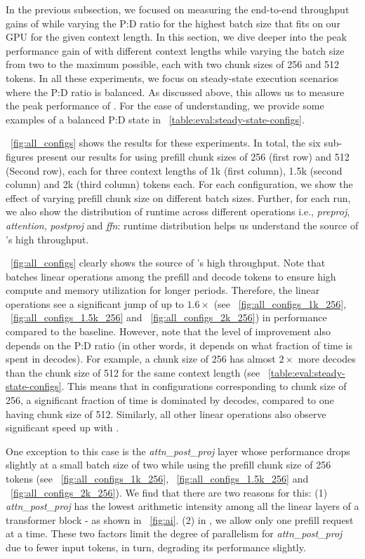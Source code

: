 


\if
In the previous subsection, we focused on measuring the end-to-end throughput gains of \sysname while varying the P:D ratio for the highest batch size that fits on our GPU for the given context length. In this section, we dive deeper into the peak performance gain of \sysname with different context lengths while varying the batch size from two to the maximum possible, each with two chunk sizes of 256 and 512 tokens. In all these experiments, we focus on steady-state execution scenarios where the P:D ratio is balanced. As discussed above, this allows us to measure the peak performance of \sysname. For the ease of understanding, we provide some examples of a balanced P:D state in ~\autoref{table:eval:steady-state-configs}.

~\autoref{fig:all_configs} shows the results for these experiments. In total, the six sub-figures present our results for using prefill chunk sizes of 256 (first row) and 512 (Second row), each for three context lengths of 1k (first column), 1.5k (second column) and 2k (third column) tokens each. For each configuration, we show the effect of varying prefill chunk size on different batch sizes. Further, for each run, we also show the distribution of runtime across different operations i.e., {\em preproj}, {\em attention}, {\em postproj} and {\em ffn}: runtime distribution helps us understand the source of \sysname's high throughput.

~\autoref{fig:all_configs} clearly shows the source of \sysname's high throughput. Note that \sysname batches linear operations among the prefill and decode tokens to ensure high compute and memory utilization for longer periods. Therefore, the linear operations see a significant jump of up to $1.6\times$ (see ~\autoref{fig:all_configs_1k_256}, ~\autoref{fig:all_configs_1.5k_256} and ~\autoref{fig:all_configs_2k_256}) in performance compared to the baseline. However, note that the level of improvement also depends on the P:D ratio (in other words, it depends on what fraction of time is spent in decodes). For example, a chunk size of 256 has almost $2\times$ more decodes than the chunk size of 512 for the same context length (see ~\autoref{table:eval:steady-state-configs}. This means that in configurations corresponding to  chunk size of 256, a significant fraction of time is dominated by decodes, compared to one having chunk size of 512. Similarly, all other linear operations also observe significant speed up with \sysname.

One exception to this case is the {\em attn\_post\_proj} layer whose performance drops slightly at a small batch size of two while using the prefill chunk size of 256 tokens (see ~\autoref{fig:all_configs_1k_256}, ~\autoref{fig:all_configs_1.5k_256} and ~\autoref{fig:all_configs_2k_256}). We find that there are two reasons for this: (1) {\em attn\_post\_proj} has the lowest arithmetic intensity among all the linear layers of a transformer block - as shown in ~\autoref{fig:ai}. (2) in \sysname, we allow only one prefill request at a time. These two factors limit the degree of parallelism for {\em attn\_post\_proj} due to fewer input tokens, in turn, degrading its performance slightly. 

